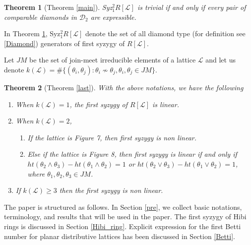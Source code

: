 \documentclass[10pt,reqno]{amsart}
\numberwithin{equation}{section}
\newtheorem{theorem}{Theorem}[section]
\begin{document}
\begin{theorem}[Theorem \ref{main}]\label{main_2}
 Syz$^{2}_{1} R[\mathcal{L}]$ is trivial if and only if every pair of comparable diamonds in $\mathcal{D}_2$ are expressible.
\end{theorem}
In Theorem \ref{main_2}, Syz$^{2}_{1} R[\mathcal{L}]$ denote the set of all diamond type (for definition see \ref{Diamond}) generators of first syzygy of $R[\mathcal{L}]$.

 Let $JM$ be the set of join-meet irreducible elements of a lattice $\mathcal{L}$ and let us denote $k(\mathcal{L})=\# \{(\theta_i,\theta_j): \theta_i \nsim \theta_j, \theta_i,\theta_j \in JM\}$.


\begin{theorem}[Theorem \ref{last}]
  With the above notations, we have the following
\begin{enumerate}
 \item When $k(\mathcal{L})=1$, the first syzygy of $R[\mathcal{L}]$ is linear.
 \item When $k(\mathcal{L})=2$,
 \begin{enumerate}
  \item If the lattice is Figure 7, then first syzygy is non linear.
  \item  Else if the lattice is Figure 8, then first syzygy is linear if and only if $ht(\theta_2 \wedge \theta_3)
 -ht(\theta_1 \wedge \theta_2)=1$ or $ht(\theta_2 \vee \theta_3)-ht(\theta_1 \vee \theta_2)=1$, where $\theta_1,\theta_2,
 \theta_3 \in JM$.
 \end{enumerate}
 \item If $k(\mathcal{L}) \geq 3$ then the first syzygy is non linear.
\end{enumerate} 
\end{theorem}


The paper is structured as follows. In Section \ref{pre}, we collect basic notations, terminology, and results that will be used in the paper. The first syzygy of Hibi rings is discussed in Section \ref{Hibi_ring}. Explicit expression for the first Betti number for planar distributive lattices has been discussed in Section \ref{Betti}.
\end{document}
